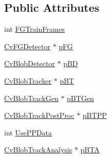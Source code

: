 \subsection*{Public Attributes}
\begin{DoxyCompactItemize}
\item 
int \hyperlink{structCvBlobTrackerAutoParam1_ae115979acfd0f0521fa5a8d1f1d50f3f}{F\-G\-Train\-Frames}
\item 
\hyperlink{classCvFGDetector}{Cv\-F\-G\-Detector} $\ast$ \hyperlink{structCvBlobTrackerAutoParam1_a4d1016a283a075d2f08c9467be0d1cbc}{p\-F\-G}
\item 
\hyperlink{classCvBlobDetector}{Cv\-Blob\-Detector} $\ast$ \hyperlink{structCvBlobTrackerAutoParam1_a376171dc37b707fd89033a8aff0b90b2}{p\-B\-D}
\item 
\hyperlink{classCvBlobTracker}{Cv\-Blob\-Tracker} $\ast$ \hyperlink{structCvBlobTrackerAutoParam1_ad3375da551ff543930a38a58a0f93fa1}{p\-B\-T}
\item 
\hyperlink{classCvBlobTrackGen}{Cv\-Blob\-Track\-Gen} $\ast$ \hyperlink{structCvBlobTrackerAutoParam1_a4f3a106b915850ccf97a06b5979305fc}{p\-B\-T\-Gen}
\item 
\hyperlink{classCvBlobTrackPostProc}{Cv\-Blob\-Track\-Post\-Proc} $\ast$ \hyperlink{structCvBlobTrackerAutoParam1_ae89784465f9f3e2f13f8ec36687c0242}{p\-B\-T\-P\-P}
\item 
int \hyperlink{structCvBlobTrackerAutoParam1_a0731cf94dda9b9f4af15db2bcab8130d}{Use\-P\-P\-Data}
\item 
\hyperlink{classCvBlobTrackAnalysis}{Cv\-Blob\-Track\-Analysis} $\ast$ \hyperlink{structCvBlobTrackerAutoParam1_a9678e2da18a6dd096c8f2035e789d288}{p\-B\-T\-A}
\end{DoxyCompactItemize}


